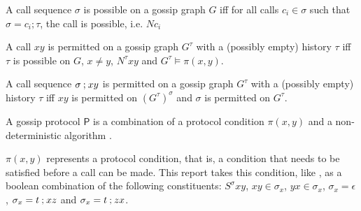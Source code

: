 \begin{definition}[Calls]
    \begin{subdefinition}
        \label{def:call-sequence-possibility}
        A call sequence \(\sigma\) is possible on a gossip graph \(G\) iff for all calls \(c_i \in \sigma\) such that \(\sigma = c_i\mathbin{;}\tau\), the call is possible, i.e. \(Nc_i\)
    \end{subdefinition}

    \begin{subdefinition}
        \label{def:call-permissibility}
        A call \(xy\) is permitted on a gossip graph \(G^\tau\) with a (possibly empty) history \(\tau\) iff \(\tau\) is possible on \(G\), \(x \neq y\), \(N^\tau xy\) and \(G^\tau \models \pi(x,y)\).
    \end{subdefinition}

    \begin{subdefinition}
        \label{def:call-sequence-permissibility}
        A call sequence \(\sigma \mathbin{;} xy\) is permitted on a gossip graph \(G^\tau\) with a (possibly empty) history \(\tau\) iff \(xy\) is permitted on \((G^\tau)^\sigma\) and \(\sigma\) is permitted on \(G^\tau\).
    \end{subdefinition}
\end{definition}

\begin{definition}
    \label{def:gossip-protocol}
    A gossip protocol \(\mathsf{P}\) is a combination of a protocol condition \(\pi(x,y)\) and a non-deterministic algorithm \parencite[for examples see][p. 708]{van_ditmarsch_dynamic_2018}.

    \begin{subdefinition}
        \label{def:protocol-condition}
        \(\pi(x,y)\) represents a protocol condition, that is, a condition that needs to be satisfied before a call can be made.
        This report takes this condition, like \textcite{van_ditmarsch_dynamic_2018}, as a boolean combination of the following constituents: \(S^\sigma xy\), \(xy \in \sigma_x\), \(yx \in \sigma_x\), \(\sigma_x = \epsilon\), \(\sigma_x = t \mathbin{;} xz\) and \(\sigma_x = t \mathbin{;} zx\).
    \end{subdefinition}
\end{definition}


